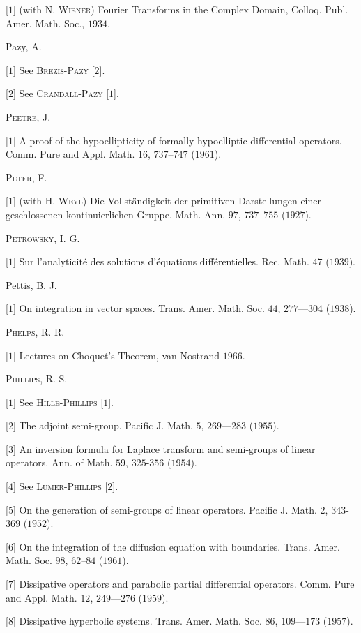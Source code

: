 [$1$] (with N. \textsc{Wiener}) Fourier Transforms in the Complex Domain, Colloq. Publ. Amer. Math. Soc., $1934$. 

Pazy, A. 

[$1$] See \textsc{Brezis}-\textsc{Pazy} [$2$]. 

[$2$] See \textsc{Crandall}-\textsc{Pazy} [$1$]. 

\textsc{Peetre}, J. 

[$1$] A proof of the hypoellipticity of formally hypoelliptic differential operators. Comm. Pure and Appl. Math. $16$, $737$--$747$ ($1961$). 

\textsc{Peter}, F. 

[$1$] (with H. \textsc{Weyl}) Die Vollständigkeit der primitiven Darstellungen einer geschlossenen kontinuierlichen Gruppe. Math. Ann. $97$, $737$--$755$ ($1927$). 

\textsc{Petrowsky}, I. G. 

[$1$] Sur l'analyticité des solutions d'équations différentielles. Rec. Math. $47$ ($1939$). 

Pettis, B. J. 

[$1$] On integration in vector spaces. Trans. Amer. Math. Soc. $44$, $277$---$304$ ($1938$). 

\textsc{Phelps}, R. R. 

[$1$] Lectures on Choquet's Theorem, van Nostrand $1966$. 

\textsc{Phillips}, R. S. 

[$1$] See \textsc{Hille}-\textsc{Phillips} [$1$]. 

[$2$] The adjoint semi-group. Pacific J. Math. $5$, $269$---$283$ ($1955$). 

[$3$] An inversion formula for Laplace transform and semi-groups of linear operators. Ann. of Math. $59$, $325$-$356$ ($1954$). 

[$4$] See \textsc{Lumer}-\textsc{Phillips} [$2$]. 

[$5$] On the generation of semi-groups of linear operators. Pacific J. Math. $2$, $343$-$369$ ($1952$). 

[$6$] On the integration of the diffusion equation with boundaries. Trans. Amer. Math. Soc. $98$, $62$--$84$ ($1961$). 

[$7$] Dissipative operators and parabolic partial differential operators. Comm. Pure and Appl. Math. $12$, $249$---$276$ ($1959$). 

[$8$] Dissipative hyperbolic systems. Trans. Amer. Math. Soc. $86$, $109$---$173$ ($1957$). 

